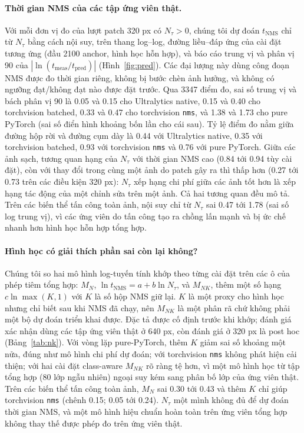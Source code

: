 \documentclass[a4paper,fleqn]{cas-dc}
\newcommand{\Ntau}{N_{\tau}}
\begin{document}
\paragraph{Thời gian NMS của các tập ứng viên thật.}
Với mỗi đơn vị đo của lượt patch 320 px có $\Ntau>0$, chúng tôi dự đoán $t_{\mathrm{NMS}}$ chỉ từ $\Ntau$ bằng cách nội suy, trên thang log--log, đường liều--đáp ứng của cài đặt tương ứng (đầu 2100 anchor, hình học hỗn hợp), và báo cáo trung vị và phân vị 90 của $|\ln(t_{\mathrm{meas}}/t_{\mathrm{pred}})|$ (Hình~\ref{fig:pred}). Các đại lượng này dùng công đoạn NMS được đo thời gian riêng, không bị bước chèn ảnh hưởng, và không có ngưỡng đạt/không đạt nào được đặt trước. Qua 3347 điểm đo, sai số trung vị và bách phân vị 90 là 0.05 và 0.15 cho Ultralytics native, 0.15 và 0.40 cho torchvision batched, 0.33 và 0.47 cho torchvision \texttt{nms}, và 1.38 và 1.73 cho pure PyTorch (sai số điển hình khoảng bốn lần cho cái sau). Tỷ lệ điểm đo nằm giữa đường hộp rời và đường cụm dày là 0.44 với Ultralytics native, 0.35 với torchvision batched, 0.93 với torchvision \texttt{nms} và 0.76 với pure PyTorch. Giữa các ảnh sạch, tương quan hạng của $\Ntau$ với thời gian NMS cao (0.84 tới 0.94 tùy cài đặt), còn với thay đổi trong cùng một ảnh do patch gây ra thì thấp hơn (0.27 tới 0.73 trên các điều kiện 320 px): $\Ntau$ xếp hạng chi phí giữa các ảnh tốt hơn là xếp hạng tác động của một chỉnh sửa trên một ảnh. Cả hai tương quan đều mô tả. Trên các biến thể tấn công toàn ảnh, nội suy chỉ từ $\Ntau$ sai 0.47 tới 1.78 (sai số log trung vị), vì các ứng viên do tấn công tạo ra chồng lấn mạnh và bị ức chế nhanh hơn hình học hỗn hợp tổng hợp.


\paragraph{Hình học có giải thích phần sai còn lại không?}
\label{sec:nk}
Chúng tôi so hai mô hình log-tuyến tính khớp theo từng cài đặt trên các ô của phép tiêm tổng hợp: $M_N$, $\ln t_{\mathrm{NMS}} = a + b\ln\Ntau$, và $M_{NK}$, thêm một số hạng $c\ln\max(K,1)$ với $K$ là số hộp NMS giữ lại. $K$ là một proxy cho hình học nhưng chỉ biết sau khi NMS đã chạy, nên $M_{NK}$ là một phân rã chứ không phải một bộ dự đoán triển khai được. Đặc tả được cố định trước khi khớp; đánh giá xác nhận dùng các tập ứng viên thật ở 640 px, còn đánh giá ở 320 px là post hoc (Bảng~\ref{tab:nk}). Với vòng lặp pure-PyTorch, thêm $K$ giảm sai số khoảng một nửa, đúng như mô hình chi phí dự đoán; với torchvision \texttt{nms} không phát hiện cải thiện; với hai cài đặt class-aware $M_{NK}$ rõ ràng tệ hơn, vì một mô hình học từ tập tổng hợp (80 lớp ngẫu nhiên) ngoại suy kém sang phân bố lớp của ứng viên thật. Trên các biến thể tấn công toàn ảnh, $M_N$ sai 0.30 tới 0.43 và thêm $K$ chỉ giúp torchvision \texttt{nms} (chênh 0.15; 0.05 tới 0.24). $\Ntau$ một mình không đủ để dự đoán thời gian NMS, và một mô hình hiệu chuẩn hoàn toàn trên ứng viên tổng hợp không thay thế được phép đo trên ứng viên thật.
\end{document}
